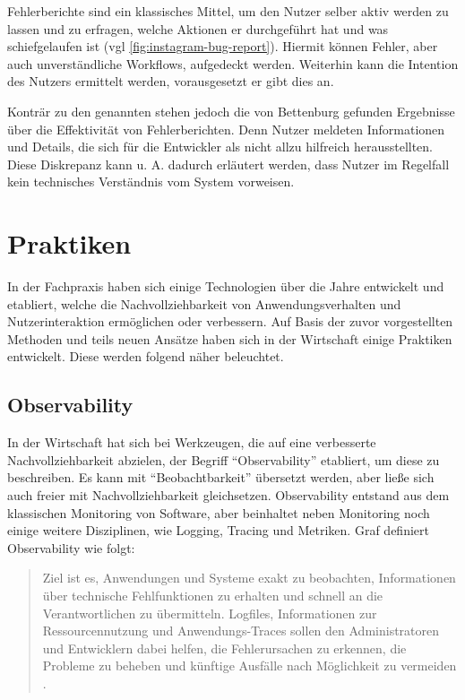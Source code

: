 Fehlerberichte sind ein klassisches Mittel, um den Nutzer selber aktiv werden zu lassen und zu erfragen, welche Aktionen er durchgeführt hat und was schiefgelaufen ist (vgl \autoref{fig:instagram-bug-report}). Hiermit können Fehler, aber auch unverständliche Workflows, aufgedeckt werden. Weiterhin kann die Intention des Nutzers ermittelt werden, vorausgesetzt er gibt dies an.

Konträr zu den genannten  stehen jedoch die von Bettenburg \etal \cite{WhatMakesAGoodBugReport} gefunden Ergebnisse über die Effektivität von Fehlerberichten. Denn Nutzer meldeten Informationen und Details, die sich für die Entwickler als nicht allzu hilfreich herausstellten. Diese Diskrepanz kann u. A. dadurch erläutert werden, dass Nutzer im Regelfall kein technisches Verständnis vom System vorweisen.

\section{Praktiken}

In der Fachpraxis haben sich einige Technologien über die Jahre entwickelt und etabliert, welche die Nachvollziehbarkeit von Anwendungsverhalten und Nutzerinteraktion ermöglichen oder verbessern. Auf Basis der zuvor vorgestellten Methoden und teils neuen Ansätze haben sich in der Wirtschaft einige Praktiken entwickelt. Diese werden folgend näher beleuchtet.

\subsection{Observability}

In der Wirtschaft hat sich bei Werkzeugen, die auf eine verbesserte Nachvollziehbarkeit abzielen, der Begriff \enquote{Observability} etabliert, um diese zu beschreiben. Es kann mit \enquote{Beobachtbarkeit} übersetzt werden, aber ließe sich auch freier mit Nachvollziehbarkeit gleichsetzen. Observability entstand aus dem klassischen Monitoring von Software, aber beinhaltet neben Monitoring noch einige weitere Disziplinen, wie Logging, Tracing und Metriken. Graf \cite{MichaelGrafBA} definiert Observability wie folgt:


\begin{quotation}
Ziel ist es, Anwendungen und Systeme exakt zu beobachten, Informationen über technische Fehlfunktionen zu erhalten und schnell an die Verantwortlichen zu übermitteln. Logfiles, Informationen zur Ressourcennutzung und Anwendungs-Traces sollen den Administratoren und Entwicklern dabei helfen, die Fehlerursachen zu erkennen, die Probleme zu beheben und künftige Ausfälle nach Möglichkeit zu vermeiden \cite{DistributedSystemsObservability}.
\end{quotation}

